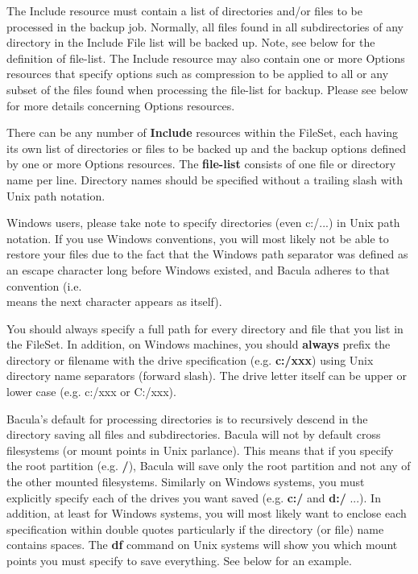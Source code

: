 The Include resource must contain a list of directories and/or files to be
processed in the backup job.  Normally, all files found in all
subdirectories of any directory in the Include File list will be backed up.
Note, see below for the definition of \lt{}file-list\gt{}.
The Include resource may also contain one or more Options resources that
specify options such as compression to be applied to all or any subset of
the files found when processing the file-list for backup. Please see
below for more details concerning Options resources.

There can be any number of {\bf Include} resources within the FileSet, each
having its own list of directories or files to be backed up and the backup
options defined by one or more Options resources.  The {\bf file-list}
consists of one file or directory name per line.  Directory names should be
specified without a trailing slash with Unix path notation.

Windows users, please take note to specify directories (even c:/...) in
Unix path notation. If you use Windows conventions, you will most likely
not be able to restore your files due to the fact that the Windows
path separator was defined as an escape character long before Windows
existed, and Bacula adheres to that convention (i.e. \\  means the next character
appears as itself).

You should always specify a full path for every directory and file that you
list in the FileSet.  In addition, on Windows machines, you should {\bf
always} prefix the directory or filename with the drive specification
(e.g.  {\bf c:/xxx}) using Unix directory name separators
(forward slash).  The drive letter itself can be upper or lower case (e.g.
c:/xxx or C:/xxx).

Bacula's default for processing directories is to recursively descend in
the directory saving all files and subdirectories.  Bacula will not by
default cross filesystems (or mount points in Unix parlance).  This means
that if you specify the root partition (e.g.  {\bf /}), Bacula will save
only the root partition and not any of the other mounted filesystems.
Similarly on Windows systems, you must explicitly specify each of the
drives you want saved (e.g.
{\bf c:/} and {\bf d:/} ...). In addition, at least for Windows systems, you
will most likely want to enclose each specification within double quotes
particularly if the directory (or file) name contains spaces. The {\bf df}
command on Unix systems will show you which mount points you must specify to
save everything. See below for an example. 

